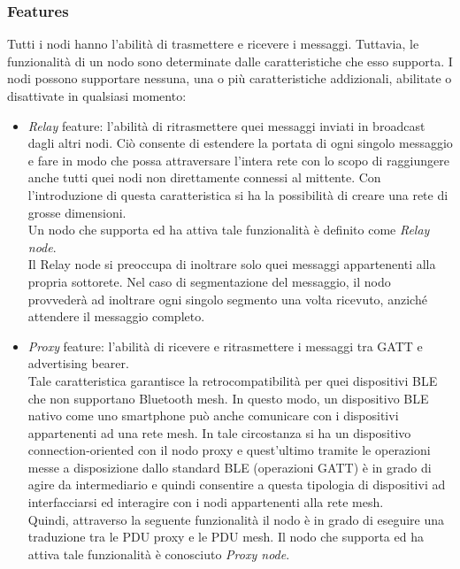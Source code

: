 \subsubsection{Features}
\label{subsub:features}
Tutti i nodi hanno l'abilità di trasmettere e ricevere i messaggi. Tuttavia, le funzionalità di un nodo sono determinate dalle caratteristiche che esso supporta. I nodi possono supportare nessuna, una o più caratteristiche addizionali, abilitate o disattivate in qualsiasi momento:
\begin{itemize}
    \item \textit{Relay} feature: l'abilità di ritrasmettere quei messaggi inviati in broadcast dagli altri nodi. 
    Ciò consente di estendere la portata di ogni singolo messaggio e fare in modo che possa attraversare l'intera rete con lo scopo di raggiungere anche tutti quei nodi non direttamente connessi al mittente. Con l'introduzione di questa caratteristica si ha la possibilità di creare una rete di grosse dimensioni.\\ %
    Un nodo che supporta ed ha attiva tale funzionalità è definito come \textit{Relay node}.\\
    Il Relay node si preoccupa di inoltrare solo quei messaggi appartenenti alla propria sottorete. Nel caso di segmentazione del messaggio, il nodo provvederà ad inoltrare ogni singolo segmento una volta ricevuto, anziché attendere il messaggio completo.
    
    \item \textit{Proxy} feature: l'abilità di ricevere e ritrasmettere i messaggi tra GATT e advertising bearer. \\
    Tale caratteristica garantisce la retrocompatibilità per quei dispositivi BLE che non supportano Bluetooth mesh. In questo modo, un dispositivo BLE nativo come uno smartphone può anche comunicare con i dispositivi appartenenti ad una rete mesh. 
    In tale circostanza si ha un dispositivo connection-oriented con il nodo proxy e quest'ultimo tramite le operazioni messe a disposizione dallo standard BLE (operazioni GATT) è in grado di agire da intermediario e quindi consentire a questa tipologia di dispositivi ad interfacciarsi ed interagire con i nodi appartenenti alla rete mesh.\\
    Quindi, attraverso la seguente funzionalità il nodo è in grado di eseguire una traduzione tra le PDU proxy e le PDU mesh. Il nodo che supporta ed ha attiva tale funzionalità è conosciuto \textit{Proxy node}.
    

\end{itemize}
